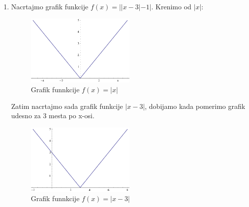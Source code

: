 \documentclass[a4paper,12pt]{article}
\begin{document}
\begin{enumerate}[1.]
\item Nacrtajmo grafik funkcije $f(x) = ||x-3|-1|$. Krenimo od $|x|$:
\begin{figure}[h!]
\begin{center}
\includegraphics[width=0.5\textwidth]{sl1.eps}
\caption{Grafik funnkcije $f(x) = |x|$}
\end{center}
\end{figure}

\par Zatim nacrtajmo sada grafik funkcije $|x-3|$, dobijamo kada pomerimo grafik udesno za 3 mesta po x-osi.

\begin{figure}[h!]
\begin{center}
\includegraphics[width=0.5\textwidth]{sl2.eps}
\caption{Grafik funnkcije $f(x) = |x-3|$}
\end{center}
\end{figure}


\end{enumerate}
\end{document}
